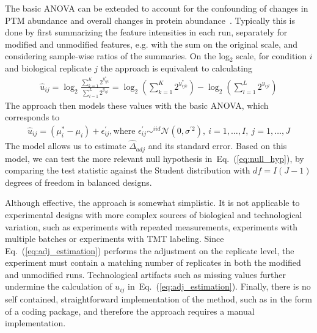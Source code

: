 \documentclass[mcp]{article}
\numberwithin{table}{section}
\def\eqref#1{Eq.~(\ref{eq:#1})}
\begin{document}
\medskip \noindent 
The basic ANOVA can be extended to account for the confounding of changes in PTM abundance and overall changes in protein abundance~\cite{Schwammle2015,THOMAS2020,Mertins:2013}. Typically this is done by first summarizing the feature intensities in each run, separately for modified and unmodified features, e.g. with the sum on the original scale, and considering sample-wise ratios of the summaries. On the log$_2$ scale, for condition $i$ and biological replicate $j$ the approach is equivalent to calculating
\begin{eqnarray}
\hat{u}_{ij} = \log_2 \frac{ \sum_{k=1}^{K} 2^{y_{ijk}^{\ast}} }{ \sum_{l=1}^{L} 2^{y_{ijl}} } = \log_2 \left( \sum_{k=1}^{K} 2^{y_{ijk}^{\ast}} \right) - \log_2 \left( \sum_{l=1}^{L} 2^{y_{ijl}} \right)
\label{eq:adj_estimation}
\end{eqnarray}
The approach then models these values with the basic ANOVA, which corresponds to 
\begin{eqnarray}
\hat{u}_{ij} = (\mu^{\ast}_{i}-\mu_i) + \epsilon^{\prime}_{ij}, \text{where } \epsilon^{\prime}_{ij} \mathop\sim^{iid} \mathcal{N}(0, \sigma^{\prime 2}),\ i=1,\ldots,I,\ j=1,\ldots,J
\label{eq:ttest_model}
\end{eqnarray}
The model allows us to estimate $\hat{\Delta}_{adj}$ and its standard error.
Based on this model, we can test the more relevant null hypothesis in~\eqref{null_hyp}, by comparing the test statistic against the Student distribution with $df=I(J-1)$ degrees of freedom in balanced designs.

Although effective, the approach is somewhat simplistic. It is not applicable to experimental designs with more complex sources of biological and technological variation, such as experiments with repeated measurements, experiments with multiple batches or experiments with TMT labeling. Since \eqref{adj_estimation} performs the adjustment on the replicate level, the experiment must contain a matching number of replicates in both the modified and unmodified runs. Technological artifacts such as missing values further undermine the calculation of $u_{ij}$ in~\eqref{adj_estimation}. Finally, there is no self contained, straightforward implementation of the method, such as in the form of a coding package, and therefore the approach requires a manual implementation.

\medskip {} 
\end{document}

